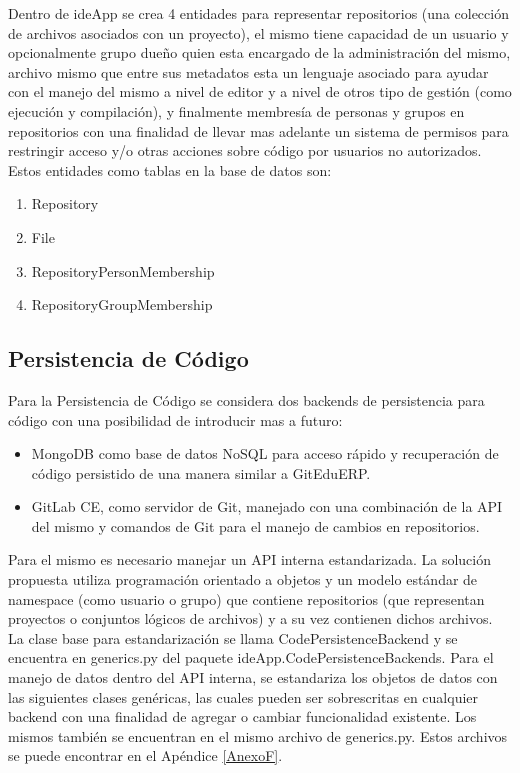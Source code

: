 Dentro de ideApp se crea 4 entidades para representar repositorios (una colección de archivos asociados con un proyecto), el mismo tiene capacidad de un usuario y opcionalmente grupo dueño quien esta encargado de la administración del mismo, archivo mismo que entre sus metadatos esta un lenguaje asociado para ayudar con el manejo del mismo a nivel de editor y a nivel de otros tipo de gestión (como ejecución y compilación), y finalmente membresía de personas y grupos en repositorios con una finalidad de llevar mas adelante un sistema de permisos para restringir acceso y/o otras acciones sobre código por usuarios no autorizados. Estos entidades como tablas en la base de datos son:
\begin{enumerate}
\item Repository
\item File
\item RepositoryPersonMembership
\item RepositoryGroupMembership
\end{enumerate}


\subsection{Persistencia de Código}
Para la Persistencia de Código se considera dos backends de persistencia para código con una posibilidad de introducir mas a futuro:
\begin{itemize}
	\item MongoDB como base de datos NoSQL para acceso rápido y recuperación de código persistido de una manera similar a GitEduERP.
    \item GitLab CE, como servidor de Git, manejado con una combinación de la API del mismo y comandos de Git para el manejo de cambios en repositorios.
\end{itemize}

Para el mismo es necesario manejar un API interna estandarizada. La solución propuesta utiliza programación orientado a objetos y un modelo estándar de namespace (como usuario o grupo) que contiene repositorios (que representan proyectos o conjuntos lógicos de archivos) y a su vez contienen dichos archivos. La clase base para estandarización se llama CodePersistenceBackend y se encuentra en generics.py del paquete ideApp.CodePersistenceBackends. Para el manejo de datos dentro del API interna, se estandariza los objetos de datos con las siguientes clases genéricas, las cuales pueden ser sobrescritas en cualquier backend con una finalidad de agregar o cambiar funcionalidad existente. Los mismos también se encuentran en el mismo archivo de generics.py. Estos archivos se puede encontrar en el Apéndice \ref{AnexoF}.

